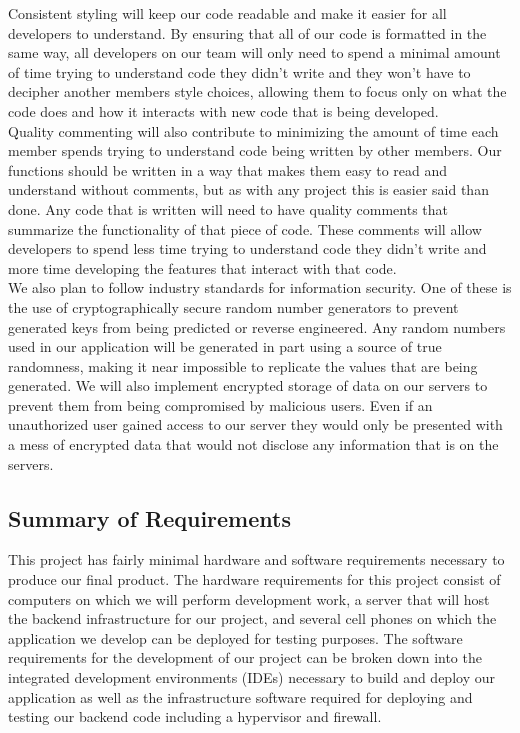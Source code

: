 \documentclass[11pt]{article}
\begin{document}
Consistent styling will keep our code readable and make it easier for all developers to understand. By ensuring that all of our code is formatted in the same way, all developers on our team will only need to spend a minimal amount of  time trying  to understand code they didn’t write and they won’t have to decipher another members style choices, allowing them to focus only on what the code does and how it interacts with new code that is being developed. \\

Quality commenting will also contribute to minimizing the amount of time each member spends trying to understand code being written by other members. Our functions should be written in a way that makes them easy to read and understand without comments, but as with any project this is easier said than done. Any code that is written will need to have quality comments that summarize the functionality of that piece of code. These comments will allow developers to spend less time trying to understand code they didn’t write and more time developing the features that interact with that code. \\

We also plan to follow industry standards for information security. One of these is the use of cryptographically secure random number generators to prevent generated keys from being predicted or reverse engineered. Any random numbers used in our application will be generated in part using a source of true randomness, making it near impossible to replicate the values that are being generated. We will also implement encrypted storage of data on our servers to prevent them from being compromised by malicious users. Even if an unauthorized user gained access to our server they would only be presented with a mess of encrypted data that would not disclose any information that is on the servers.


\subsection*{Summary of Requirements}
This project has fairly minimal hardware and software requirements necessary to produce our final product. The hardware requirements for this project consist of computers on which we will perform development work, a server that will host the backend infrastructure for our project, and several cell phones on which the application we develop can be deployed for testing purposes. The software requirements for the development of our project can be broken down into the integrated development environments (IDEs) necessary to build and deploy our application as well as the infrastructure software required for deploying and testing our backend code including a hypervisor and firewall. \\ 
\end{document}
